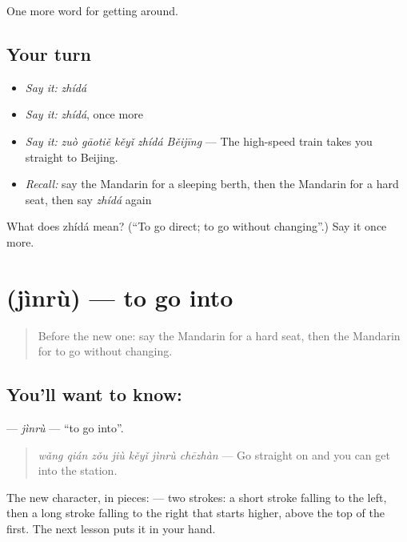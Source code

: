 \begin{grammarlens}[title={What you've built}]
One more word for getting around.
\end{grammarlens}

\subsection*{Your turn}
\begin{itemize}
\raggedright
  \item \emph{Say it:} \emph{zhídá}
  \item \emph{Say it:} \emph{zhídá}, once more
  \item \emph{Say it:} \emph{zuò gāotiě kěyǐ zhídá Běijīng} — The high-speed train takes you straight to Beijing.
  \item \emph{Recall:} say the Mandarin for a sleeping berth, then the Mandarin for a hard seat, then say \emph{zhídá} again
\end{itemize}

\begin{tcolorbox}[breakable,colback=teal!4,colframe=teal!35!black,title={Before you move on}]
What does zhídá mean? (\textquotedblleft{}To go direct; to go without changing\textquotedblright{}.) Say it once more.
\end{tcolorbox}
\section[\texorpdfstring{\zh{进入} (jìnrù)}{进入 (jìnrù)}]{ (jìnrù) — to go into}

\label{lesson:ZH-C405-jinru}



\begin{quote}
Before the new one: say the Mandarin for a hard seat, then the Mandarin for to go without changing.
\end{quote}

\subsection*{You'll want to know: }
\textbf{} — \emph{jìnrù} — \textquotedblleft{}to go into\textquotedblright{}.

\begin{quote}
\emph{wǎng qián zǒu jiù kěyǐ jìnrù chēzhàn} — Go straight on and you can get into the station.
\end{quote}

The new character, in pieces:  — two strokes: a short stroke falling to the left, then a long stroke falling to the right that starts higher, above the top of the first. The next lesson puts it in your hand.

